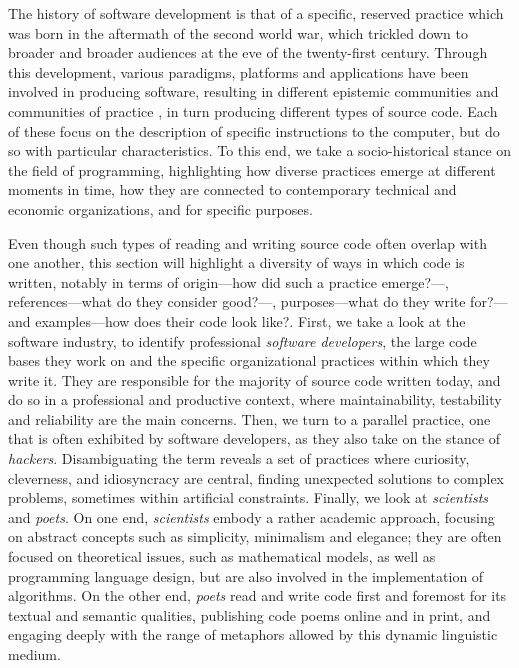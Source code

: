 The history of software development is that of a specific, reserved practice which was born in the aftermath of the second world war, which trickled down to broader and broader audiences at the eve of the twenty-first century. Through this development, various paradigms, platforms and applications have been involved in producing software, resulting in different epistemic communities and communities of practice \citep{cohendet_organisational_2001}, in turn producing different types of source code. Each of these focus on the description of specific instructions to the computer, but do so with particular characteristics. To this end, we take a socio-historical stance on the field of programming, highlighting how diverse practices emerge at different moments in time, how they are connected to contemporary technical and economic organizations, and for specific purposes.

Even though such types of reading and writing source code often overlap with one another, this section will highlight a diversity of  ways in which code is written, notably in terms of origin—how did such a practice emerge?—, references—what do they consider good?—, purposes—what do they write for?—and examples—how does their code look like?. First, we take a look at the software industry, to identify professional \emph{software developers}, the large code bases they work on and the specific organizational practices within which they write it. They are responsible for the majority of source code written today, and do so in a professional and productive context, where maintainability, testability and reliability are the main concerns. Then, we turn to a parallel practice, one that is often exhibited by software developers, as they also take on the stance of \emph{hackers}. Disambiguating the term reveals a set of practices where curiosity, cleverness, and idiosyncracy are central, finding unexpected solutions to complex problems, sometimes within artificial constraints. Finally, we look at \emph{scientists} and \emph{poets}. On one end, \emph{scientists} embody a rather academic approach,  focusing on abstract concepts such as simplicity, minimalism and elegance; they are often focused on theoretical issues, such as mathematical models, as well as programming language design, but are also involved in the implementation of algorithms. On the other end, \emph{poets} read and write code first and foremost for its textual and semantic qualities, publishing code poems online and in print, and engaging deeply with the range of metaphors allowed by this dynamic linguistic medium.

